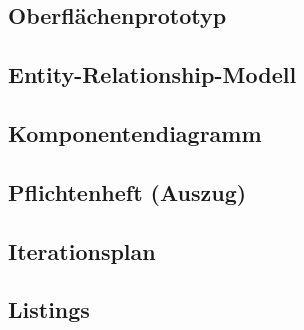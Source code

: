 	\subsection{Oberflächenprototyp}
		
		\newpage
		
	\subsection{Entity-Relationship-Modell}
		
		\newpage
		
	\subsection{Komponentendiagramm}
		
		\newpage
		
	\subsection{Pflichtenheft (Auszug)}
		
		\newpage
		
	\subsection{Iterationsplan}
		
		\newpage
		
	\subsection{Listings}
		
		\newpage
		
